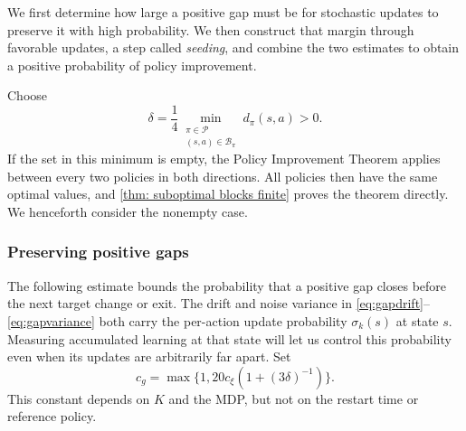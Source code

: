 \documentclass[twoside,11pt]{article}
\DeclareRobustCommand{\reviewbarstart}{%
  \ifhmode %
    \vadjust{\vbox to 0pt{%
      \vskip-\ht\strutbox %
      \vskip-\dp\strutbox %
      \cbstart[\changebarwidth] %
      \vss %
    }}%
  \else %
    \cbstart[\changebarwidth]%
  \fi %
} %
\providecommand{\DIFadd}[1]{#1} %
\providecommand{\DIFaddbegin}{\reviewbarstart} %
\providecommand{\DIFaddend}{\protect\cbend} %
\def\DIFadd#1{#1}%
\def\DIFaddbegin{}%
\def\DIFaddend{}%
\begin{document}
 \DIFaddbegin \DIFadd{We first determine how large a positive gap must be for stochastic updates to preserve it with high probability. We then construct that margin through favorable updates, a step called \emph{seeding}, and combine the two estimates to obtain a positive probability of policy improvement}\DIFaddend .

 \DIFaddbegin \DIFadd{Choose
}\begin{equation}
\DIFadd{\label{eq:constants}
\delta=\frac{1}{4}\min_{\substack{\pi\in\mathcal P\\(s,a)\in\mathcal B_\pi}}d_\pi(s,a)>0.
}\end{equation}\DIFaddend 
 \DIFaddbegin \DIFadd{If the set in this minimum is empty, the Policy Improvement Theorem applies between every two policies in both directions. All policies then have the same optimal values, }\DIFaddend and  \DIFaddbegin \DIFadd{\autoref{thm: suboptimal blocks finite} proves the theorem directly. We henceforth consider the nonempty case.
}\DIFaddend 

 \DIFaddbegin \subsubsection{\DIFadd{Preserving positive gaps}}
\DIFadd{The following estimate bounds the probability that a positive gap closes before the next target change or exit. The drift and noise variance in \eqref{eq:gapdrift}--\eqref{eq:gapvariance} both carry the per-action update probability $\sigma_k(s)$ at state $s$. Measuring accumulated learning at that state will let us control this probability even when its updates are arbitrarily far apart. Set
}\begin{equation}
\DIFadd{\label{eq:c-def}
c_g=\max\{1,20c_\xi(1+(3\delta)^{-1})\}.
}\end{equation}\DIFaddend 
 \DIFaddbegin \DIFadd{This constant depends on $K$ and }\DIFaddend the  \DIFaddbegin \DIFadd{MDP, but not on the restart time or reference policy.
}\DIFaddend 
\end{document}
